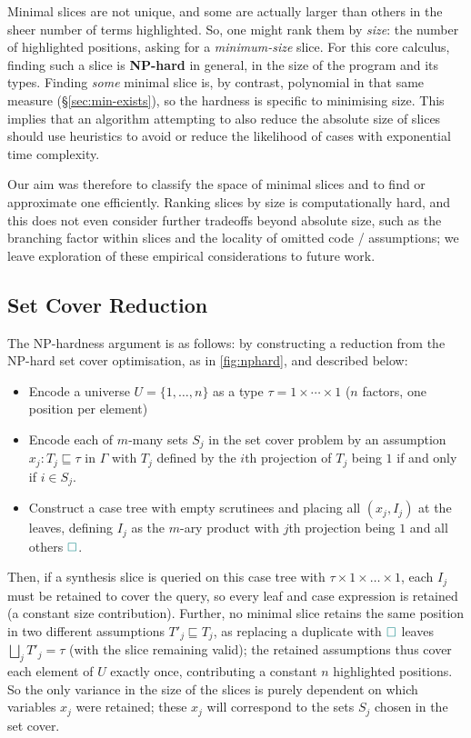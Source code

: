Minimal slices are not unique, and some are actually larger than others in the sheer number of terms highlighted. So, one might rank them by \textit{size}: the number of highlighted positions, asking for a \textit{minimum-size} slice. For this core calculus, finding such a slice is \textbf{NP-hard} in general, in the size of the program and its types. Finding \textit{some} minimal slice is, by contrast, polynomial in that same measure (\S\ref{sec:min-exists}), so the hardness is specific to minimising size. This implies that an algorithm attempting to also reduce the absolute size of slices should use heuristics to avoid or reduce the likelihood of cases with exponential time complexity. 

Our aim was therefore to classify the space of minimal slices and to find or approximate one efficiently. Ranking slices by size is computationally hard, and this does not even consider further tradeoffs beyond absolute size, such as the branching factor within slices and the locality of omitted code / assumptions; we leave exploration of these empirical considerations to future work.

\subsection{Set Cover Reduction} The NP-hardness argument is as follows: by constructing a reduction from the NP-hard set cover optimisation, as in \cref{fig:nphard}, and described below:
\begin{itemize}
  \item Encode a universe $U = \{1,\dots,n\}$ as a type $\tau = 1 \times \cdots \times 1$ ($n$ factors, one position per element)
\item Encode each of $m$-many sets $S_j$ in the set cover problem by an assumption $x_j : T_j \sqsubseteq \tau$ in $\Gamma$ with $T_j$ defined by the $i$th projection of $T_j$ being $1$ if and only if $i \in S_j$.
\item Construct a case tree with empty scrutinees and placing all $(x_j, I_j)$ at the leaves, defining $I_j$ as the $m$-ary product with $j$th projection being $1$ and all others ${\color{teal}\Box}$.
\end{itemize}

Then, if a synthesis slice is queried on this case tree with $\tau \times 1 \times \dots \times 1$, each $I_j$ must be retained to cover the query, so every leaf and case expression is retained (a constant size contribution). Further, no minimal slice retains the same position in two different assumptions $T'_j \sqsubseteq T_j$, as replacing a duplicate with ${\color{teal}\Box}$ leaves $\bigsqcup_{j}T'_j = \tau$ (with the slice remaining valid); the retained assumptions thus cover each element of $U$ exactly once, contributing a constant $n$ highlighted positions. So the only variance in the size of the slices is purely dependent on which variables $x_j$ were retained; these $x_j$ will correspond to the sets $S_j$ chosen in the set cover.

